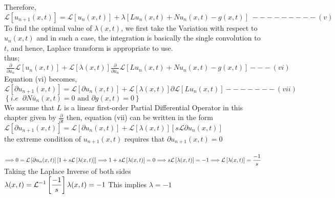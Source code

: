 \documentclass[a4paper 11pt]{article}
\newcommand{\Laplace}{\mathcal{L}}
\newcommand{\sbracket}[1]{\left[#1\right]}
\newcommand{\Un}[2]{u_{#1}(#2)}
\newcommand{\NI}{\noindent}
\newcommand{\InverseL}[1]{\Laplace^{-1}\left[#1\right]}
\newcommand{\LT}[1]{\Laplace \left[#1\right]}
\begin{document}
\NI Therefore, 
$$
\LT{\Un{n+1}{x,t}} = \LT{\Un{n}{x,t}} + \lambda \sbracket{L\Un{n}{x,t} + N\Un{n}{x,t} - g(x,t)} \; - - - - - - - - - (v)
$$
To find the optimal value of $\lambda(x,t)$, we first take the Variation with respect to $\Un{n}{x,t}$ and in such a case, the integration is basically the single convolution to $t$, and hence, Laplace transform  is appropriate to use. \\[0.2cm]

\NI thus;\\
$\; \displaystyle
\frac{\partial}{\partial u_n}\LT{\Un{n}{x,t}} + \LT{\lambda(x,t)}\frac{\partial}{\partial u_n}\LT{L\Un{n}{x,t} + N\Un{n}{x,t} - g(x,t)} - - - (vi)
$\\[0.3cm]
Equation (vi) becomes,\\[0.2cm]
$\displaystyle
\LT{\partial\Un{n+1}{x,t}} = \LT{\partial u_n(x,t)} + \LT{\lambda (x,t)}\partial \LT{L\Un{n}{x,t}} - - - - - - - (vii)
$\\[0.3cm]
$\displaystyle
\left\{ i.e \; \; \partial N\bar{u}_{n}(x,t) = 0 \text{ and } \partial g(x,t) = 0\right\}
$\\[0.2cm]

\NI We assume that $L$ is a linear first-order Partial Differential Operator in this chapter given by $\displaystyle \frac{\partial}{\partial t}$ then, equation (vii) can be written in the form\\[0.2cm]
$\displaystyle
\LT{\partial\Un{n+1}{x,t}} = \LT{\partial\Un{n}{x,t}} + \LT{\lambda(x,t)}\sbracket{s\Laplace \partial\Un{n}{x,t}}
$\\[0.2cm]
the extreme condition of $\Un{n+1}{x,t}$ requires that $\partial\Un{n+1}{x,t} = 0$\\[0.2cm]\
$\displaystyle
\Longrightarrow 0 = \LT{\partial\Un{n}{x,t}}\left[1 + s\LT{\lambda(x,t)}\right] \\[0.2cm]
\Longrightarrow 1 + s\LT{\lambda(x,t)} = 0 \\[0.2cm]
\Longrightarrow s\LT{\lambda(x,t)} = - 1 \\[0.2cm]
\Longrightarrow \LT{\lambda(x,t)} = \frac{-1}{s}
$\\[0.2cm]

\NI Taking the Laplace Inverse of both sides\\[0.2cm]
$\displaystyle
\lambda(x,t) = \InverseL{\frac{-1}{s}} \\[0.2cm]
\lambda(x,t) = - 1  \\[0.2cm]
$
This implies $\lambda = -1$\\[0.3cm]
\end{document}
